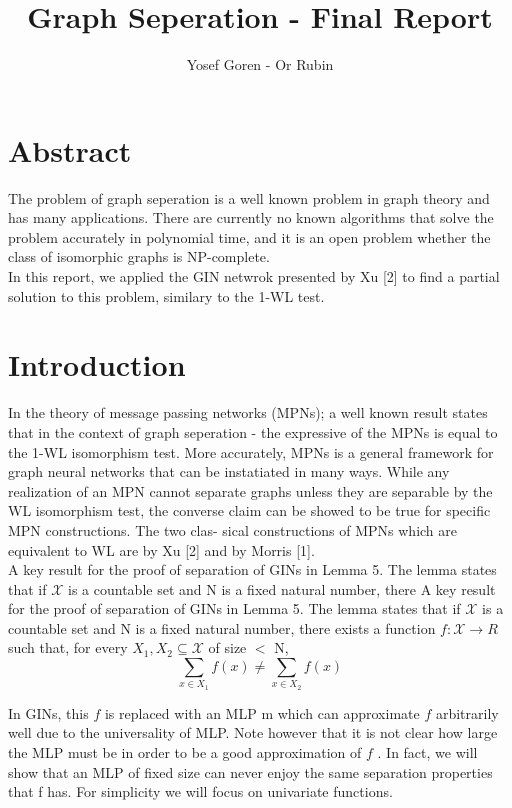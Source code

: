 \documentclass{article}
\begin{document}
\author{Yosef Goren - Or Rubin}
\title{Graph Seperation - Final Report}
\maketitle
\part*{Abstract}
The problem of graph seperation is a well known problem in graph theory and has many applications.
There are currently no known algorithms that solve the problem accurately in polynomial time, and it is an open
problem whether the class of isomorphic graphs is NP-complete.\\
In this report, we applied the GIN netwrok presented by Xu [2] to find a partial solution to this problem, 
similary to the 1-WL test.


\part*{Introduction}
In the theory of message passing networks (MPNs); a well known result states 
that in the context of graph seperation - the expressive of the MPNs is equal to the 1-WL isomorphism test.
More accurately, MPNs is a general framework for graph neural networks that can be
instatiated in many ways. While any realization of an MPN cannot separate
graphs unless they are separable by the WL isomorphism test, the converse
claim can be showed to be true for specific MPN constructions. The two clas-
sical constructions of MPNs which are equivalent to WL are by Xu [2] and by
Morris [1].\\

A key result for the proof of separation of GINs in Lemma 5. The lemma
states that if $\mathcal{X}$ is a countable set and N is a fixed natural number, there
A key result for the proof of separation of GINs in Lemma 5. The lemma
states that if $\mathcal{X}$ is a countable set and N is a fixed natural number, there
exists a function $f : \mathcal{X} \rightarrow R$ such that, for every $X_1, X_2 \subseteq \mathcal{X}$
of size $<$ N,
\[
    \sum_{x\in X_1}f(x) \neq \sum_{x\in X_2}f(x)
\]

In GINs, this $f$ is replaced with an MLP m which can approximate $f$
arbitrarily well due to the universality of MLP. Note however that it is
not clear how large the MLP must be in order to be a good approximation
of $f$ . In fact, we will show that an MLP of fixed size can never enjoy the
same separation properties that f has. For simplicity we will focus on
univariate functions.
\end{document}
